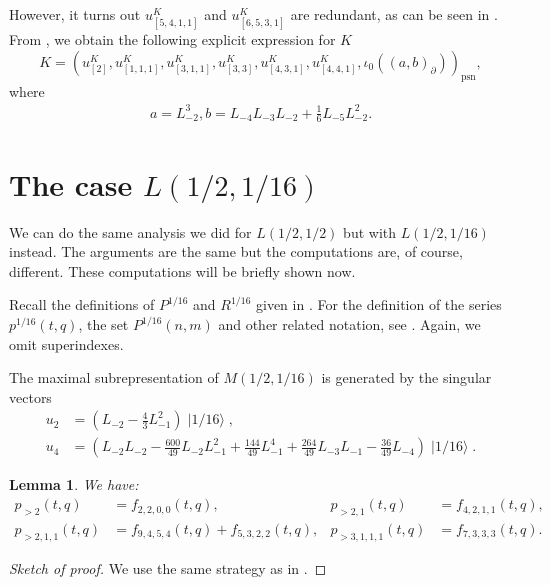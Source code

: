 \documentclass[a4paper, 12pt, reqno]{amsart}
\newtheorem{lemma}[theorem]{Lemma}
\theoremstyle{remark}
\DeclareMathOperator{\psn}{psn}
\DeclareMathOperator{\vacsixteen}{|1/16\rangle}
\begin{document}
However, it turns out $u^K_{[5, 4, 1, 1]}$ and $u^K_{[6, 5, 3, 1]}$ are redundant, as can be seen in \cite[m11-m15.ipynb]{sagemath2}.
From \cite[Theorem 2]{andrews_singular_2022}, we obtain the following explicit expression for $K$
\begin{equation*}
  K = (u^K_{[2]}, u^K_{[1, 1, 1]}, u^K_{[3, 1, 1]}, u^K_{[3, 3]}, u^K_{[4, 3, 1]}, u^K_{[4, 4, 1]}, \iota_0((a, b)_{\partial}))_{\psn},
\end{equation*}
where
\begin{align*}
  a = L_{-2}^3, b = L_{-4}L_{-3}L_{-2} + \tfrac{1}{6}L_{-5}L_{-2}^2.
\end{align*}

\section{The case $L(1/2, 1/16)$}
\label{sec:case-l12-116}

We can do the same analysis we did for $L(1/2, 1/2)$ but with $L(1/2, 1/16)$ instead.
The arguments are the same but the computations are, of course, different.
These computations will be briefly shown now.

Recall the definitions of $P^{1/16}$ and $R^{1/16}$ given in .
For the definition of the series $p^{1/16}(t, q)$, the set $P^{1/16}(n, m)$ and other related notation, see .
Again, we omit superindexes.

The maximal subrepresentation of $M(1/2, 1/16)$ is generated by the singular vectors
\begin{align*}
  u_2 &= (L_{-2} - \tfrac{4}{3} L_{-1}^2)\vacsixteen, \\
  u_4 &= (L_{-2}L_{-2} - \tfrac{600}{49}L_{-2}L_{-1}^2 + \tfrac{144}{49}L_{-1}^4 + \tfrac{264}{49}L_{-3}L_{-1} - \tfrac{36}{49}L_{-4})\vacsixteen.
\end{align*}

\begin{lemma}
  \label{lmm:12}
  We have:
  \begin{align*}
    p_{>2}(t, q) &= f_{2, 2, 0, 0}(t, q), &p_{>2, 1}(t, q) &= f_{4, 2, 1, 1}(t, q), \\
    p_{>2, 1, 1}(t, q) &= f_{9, 4, 5, 4}(t, q) + f_{5, 3, 2, 2}(t, q), &p_{>3, 1, 1, 1}(t, q) &= f_{7, 3, 3, 3}(t, q).
  \end{align*}
\end{lemma}

\begin{proof}[Sketch of proof]
  We use the same strategy as in .
\end{proof}
\end{document}
